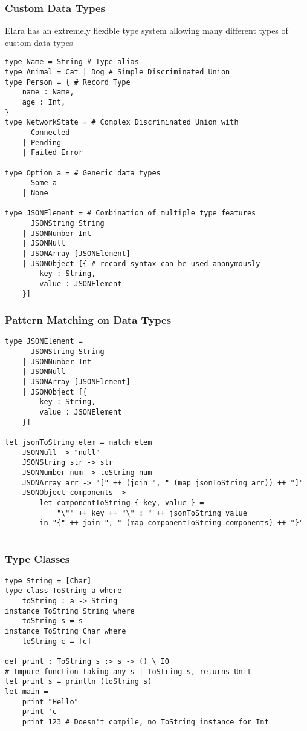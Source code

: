 \documentclass{article}
\begin{document}
\subsubsection{Custom Data Types}
Elara has an extremely flexible type system allowing many different types of custom data types
\begin{verbatim}
type Name = String # Type alias
type Animal = Cat | Dog # Simple Discriminated Union
type Person = { # Record Type
    name : Name,
    age : Int,
}
type NetworkState = # Complex Discriminated Union with
      Connected
    | Pending
    | Failed Error

type Option a = # Generic data types
      Some a
    | None

type JSONElement = # Combination of multiple type features
      JSONString String
    | JSONNumber Int
    | JSONNull
    | JSONArray [JSONElement]
    | JSONObject [{ # record syntax can be used anonymously
        key : String,
        value : JSONElement
    }] 
\end{verbatim}

\subsubsection{Pattern Matching on Data Types}
\begin{verbatim}
type JSONElement =
      JSONString String
    | JSONNumber Int
    | JSONNull
    | JSONArray [JSONElement]
    | JSONObject [{
        key : String,
        value : JSONElement
    }]

let jsonToString elem = match elem
    JSONNull -> "null"
    JSONString str -> str
    JSONNumber num -> toString num
    JSONArray arr -> "[" ++ (join ", " (map jsonToString arr)) ++ "]"
    JSONObject components -> 
        let componentToString { key, value } = 
            "\"" ++ key ++ "\" : " ++ jsonToString value
        in "{" ++ join ", " (map componentToString components) ++ "}"
    
\end{verbatim}

\subsubsection{Type Classes}
\begin{verbatim}
type String = [Char]
type class ToString a where
    toString : a -> String
instance ToString String where
    toString s = s
instance ToString Char where
    toString c = [c]

def print : ToString s :> s -> () \ IO
# Impure function taking any s | ToString s, returns Unit
let print s = println (toString s)
let main = 
    print "Hello"
    print 'c'
    print 123 # Doesn't compile, no ToString instance for Int
\end{verbatim}
\end{document}
